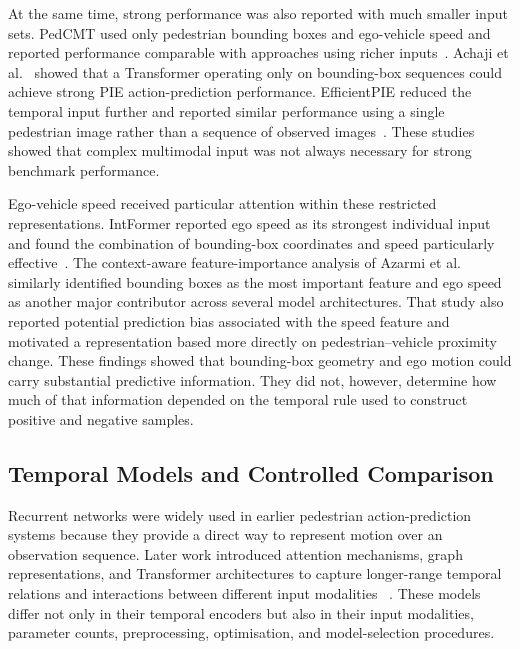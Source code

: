 \documentclass[mti,article,submit,moreauthors]{Definitions/mdpi}
\begin{document}
At the same time, strong performance was also reported with much smaller input sets. PedCMT used only pedestrian bounding boxes and ego-vehicle speed and reported performance comparable with approaches using richer inputs~\citep{chen2024pedcmt}. Achaji et al.~\citep{achaji2022attention} showed that a Transformer operating only on bounding-box sequences could achieve strong PIE action-prediction performance. EfficientPIE reduced the temporal input further and reported similar performance using a single pedestrian image rather than a sequence of observed images~\citep{qu2025efficientpie}. These studies showed that complex multimodal input was not always necessary for strong benchmark performance.

Ego-vehicle speed received particular attention within these restricted representations. IntFormer reported ego speed as its strongest individual input and found the combination of bounding-box coordinates and speed particularly effective~\citep{lorenzo2021intformer}. The context-aware feature-importance analysis of Azarmi et al.~\citep{azarmi2024featureimportance} similarly identified bounding boxes as the most important feature and ego speed as another major contributor across several model architectures. That study also reported potential prediction bias associated with the speed feature and motivated a representation based more directly on pedestrian--vehicle proximity change. These findings showed that bounding-box geometry and ego motion could carry substantial predictive information. They did not, however, determine how much of that information depended on the temporal rule used to construct positive and negative samples.


\subsection{Temporal Models and Controlled Comparison}

Recurrent networks were widely used in earlier pedestrian action-prediction systems because
they provide a direct way to represent motion over an observation sequence. Later work
introduced attention mechanisms, graph representations, and Transformer architectures to
capture longer-range temporal relations and interactions between different input modalities
~\citep{kotseruba2021benchmark,cadena2022pedgraph,lorenzo2021intformer,
zhou2023pit,rasouli2021biped,rasouli2023pedformer,xie2025gtranspdm}. These models
differ not only in their temporal encoders but also in their input modalities, parameter
counts, preprocessing, optimisation, and model-selection procedures.
\end{document}
